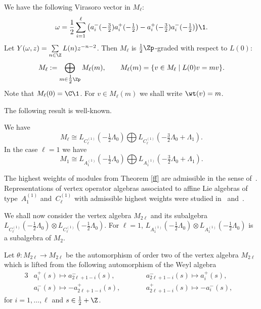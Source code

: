 We have the following Virasoro vector in $M_{\ell}$:
\begin{gather} \label{vir-bos}  \omega=\frac{1}{2} \sum_{i=1} ^{\ell} \big( a_i
^-  (- \tfrac{3}{2} ) a_i ^{+}  (-\tfrac{1}{2}  ) -a_i ^+  (-  \tfrac{3}{2} )
a_i ^{-} (-\tfrac{1}{2}  ) \big) {\1}.
\end{gather}
Let $Y(\omega,z) = \sum\limits_{n \in {\Z} } L(n) z ^{-n-2}$.
Then $M_{\ell}$ is $\tfrac{1}{2}{\Zp}$-graded with respect to
$L(0)$:
\[ M_{\ell} := \bigoplus_{ m \in \tfrac{1}{2} \Zp} M_{\ell} (m),
\qquad M_{\ell} (m)= \{ v \in M_{\ell} \; \vert \;  L(0) v = m v \}.\]
Note that $M_{\ell} (0) = {\C} {\1}$. For $ v \in M_{\ell} (m)$ we
shall write $\wt (v) = m$.

The following result is well-known.

\begin{theorem}[\cite{FF}] \label{ff}
We have
\[  M_{\ell} \cong L_{C_{\ell} ^{(1)}}( -\tfrac{1}{2}\Lambda _{0})
\bigoplus L_{C_{\ell} ^{(1)}}( -\tfrac{3}{2}\Lambda _{0} +
\Lambda_1). \]
In the case $\ell =1$ we have \[  M_1 \cong L_{A_1 ^{(1)}}(
-\tfrac{1}{2}\Lambda _{0}) \bigoplus L_{A_1 ^{(1)}}(
-\tfrac{3}{2}\Lambda _{0} + \Lambda_1). \]
\end{theorem}

\begin{remark} The highest weights of modules from Theorem \ref{ff}
are admissible in the sense of~\cite{KW}. Representations of vertex
operator algebras associated to af\/f\/ine Lie algebras of type~$A_1
^{(1)}$ and~$C_{\ell} ^{(1)}$ with admissible highest weights were
studied in~\cite{AM} and~\cite{A-1994}.
\end{remark}

We shall now consider the vertex algebra $M_{2 \ell}$ and its
subalgebra $L_{C_{\ell} ^{(1)}}( -\tfrac{1}{2}\Lambda _{0}) \otimes
L_{C_{\ell} ^{(1)}}( -\tfrac{1}{2}\Lambda _{0})$. For $\ell =1$,
$L_{A_1 ^{(1)}}(-\tfrac{1}{2}\Lambda_0) \otimes L_{A_1
^{(1)}}(-\tfrac{1}{2}\Lambda_0)$ is a subalgebra of $M_{2}$.





Let $\theta : M_{2 \ell} \rightarrow M_{2 \ell}$ be the automorphism
of order two of  the vertex algebra $M_{2 \ell}$ which is lifted
from the following automorphism of the Weyl algebra
\begin{alignat*}{3}
& a_{i} ^+ (s) \mapsto  a_{2\ell+1-i} ^{-} (s), \qquad
&& a_{2\ell+1-i} ^- (s) \mapsto  a_{i} ^{+} (s), &  \\
& a_{i} ^-(s) \mapsto - a_{2\ell+1-i} ^+ (s), \qquad && a_{2\ell+1-i}
^+(s) \mapsto - a_{i} ^- (s), &
 \end{alignat*}
for $i =1, \dots, \ell$ and  $s \in \tfrac{1}{2} + {\Z}$.

